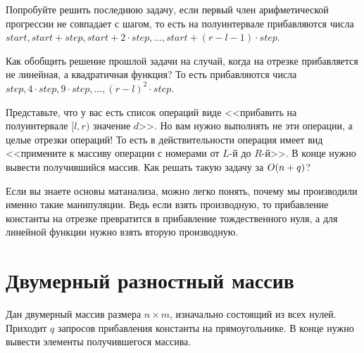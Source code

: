 
\begin{exercise}
    Попробуйте решить последнюю задачу, если первый член арифметической прогрессии не совпадает с шагом, то есть на полуинтервале прибавляются числа $start, start + step, start + 2 \cdot step, \ldots, start + \left(r - l - 1\right) \cdot step$.
\end{exercise}

\begin{exercise}
    Как обобщить решение прошлой задачи на случай, когда на отрезке прибавляется не линейная, а квадратичная функция?
    То есть прибавляются числа $step, 4 \cdot step, 9 \cdot step, \ldots, (r - l)^2 \cdot step$.
\end{exercise}

\begin{exercise}
    Представьте, что у вас есть список операций виде <<прибавить на полуинтервале $[l, r)$ значение $d$>>. Но вам нужно выполнять не эти операции, а целые отрезки операций! То есть в действительности операция имеет вид <<примените к массиву операции с номерами от $L$-й до $R$-й>>.
    В конце нужно вывести получившийся массив.
    Как решать такую задачу за $O(n + q)$?
\end{exercise}

\begin{observation}
    Если вы знаете основы матанализа, можно легко понять, почему мы производили именно такие манипуляции. Ведь если взять производную, то прибавление константы на отрезке превратится в прибавление тождественного нуля, а для линейной функции нужно взять вторую производную.
\end{observation}


\section{Двумерный разностный массив}

\begin{problem}
    Дан двумерный массив размера $n \times m$, изначально состоящий из всех нулей. Приходит $q$ запросов прибавления константы на прямоугольнике. В конце нужно вывести элементы получившегося массива.
\end{problem}

